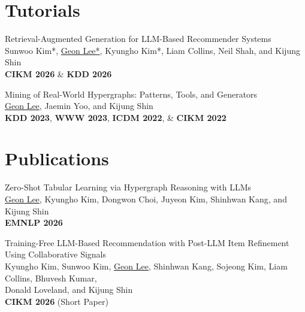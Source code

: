\documentclass[11pt, letterpaper]{article}
\begin{document}
\vspace{10pt}
\section*{Tutorials}
\vspace{5pt}

{\sloppy
\begin{enumerate}[
  label={\textcolor{ACCENT}{[\arabic*]}},
  leftmargin=1.8em,
  itemsep=0.7em   %
]

\item Retrieval-Augmented Generation for LLM-Based Recommender Systems\\
Sunwoo Kim*, \underline{Geon Lee*}, Kyungho Kim*, Liam Collins, Neil Shah, and Kijung Shin\\
\textbf{CIKM 2026} \& \textbf{KDD 2026}

\item Mining of Real-World Hypergraphs: Patterns, Tools, and Generators\\
\underline{Geon Lee}, Jaemin Yoo, and Kijung Shin\\
\textbf{KDD 2023}, \textbf{WWW 2023}, \textbf{ICDM 2022}, \& \textbf{CIKM 2022}

\end{enumerate}



\section*{Publications}
\vspace{3pt}

{\sloppy
\begin{enumerate}[
  label={\textcolor{ACCENT}{[\arabic*]}},
  leftmargin=1.8em,
  itemsep=0.7em   %
]

\item Zero-Shot Tabular Learning via Hypergraph Reasoning with LLMs\\
\underline{Geon Lee}, Kyungho Kim, Dongwon Choi, Juyeon Kim, Shinhwan Kang, and Kijung Shin\\
\textbf{EMNLP 2026} 

\item Training-Free LLM-Based Recommendation with Post-LLM Item Refinement Using Collaborative Signals\\
Kyungho Kim, Sunwoo Kim, \underline{Geon Lee}, Shinhwan Kang, Sojeong Kim, Liam Collins, Bhuvesh Kumar, \\Donald Loveland, and Kijung Shin\\
\textbf{CIKM 2026} (Short Paper)


\end{enumerate}}}
\end{document}

